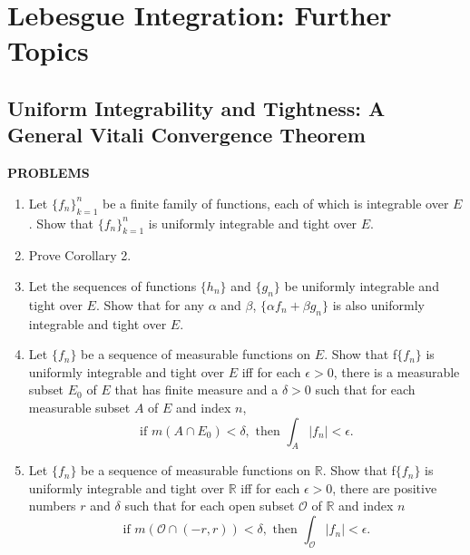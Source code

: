 \chapter{Lebesgue Integration: Further Topics}

\section{Uniform Integrability and Tightness: A General Vitali Convergence Theorem}
\begin{center}
	\textbf{PROBLEMS}
\end{center}
\begin{enumerate}
	\setcounter{enumi}{0}
    \item Let $\{f_n\}_{k=1}^n$ be a finite family of functions, each of which is integrable over $E$.
    Show that $\{f_n\}_{k=1}^n$ is uniformly integrable and tight over $E$.
    \item Prove Corollary 2.
    \item Let the sequences of functions $\{h_n\}$ and $\{g_n\}$ be uniformly integrable and tight over $E$.
    Show that for any $\alpha$ and $\beta$, $\{\alpha f_n +\beta g_n\}$ is also uniformly integrable and tight over $E$.
    \item Let $\{f_n\}$ be a sequence of measurable functions on $E$. Show that f$\{f_n\}$ is uniformly integrable and tight over $E$ iff for each $\epsilon>0$, there is a measurable subset $E_0$ of $E$ that has finite measure and a $\delta>0$ such that for each measurable subset $A$ of $E$ and index $n$,
    \[
        \text{if }m(A\cap E_0)<\delta,\text{ then }\int_A|f_n|<\epsilon.  
    \]
    \item Let $\{f_n\}$ be a sequence of measurable functions on $\mathbb{R}$. Show that f$\{f_n\}$ is uniformly integrable and tight over $\mathbb{R}$ iff for each $\epsilon>0$, there are positive numbers $r$ and $\delta$ such that for each open subset $\mathcal{O}$ of $\mathbb{R}$ and index $n$
    \[
        \text{if }m(\mathcal{O}\cap(-r,r))<\delta,\text{ then }\int_{\mathcal{O}}|f_n|<\epsilon.  
    \]
\end{enumerate}

